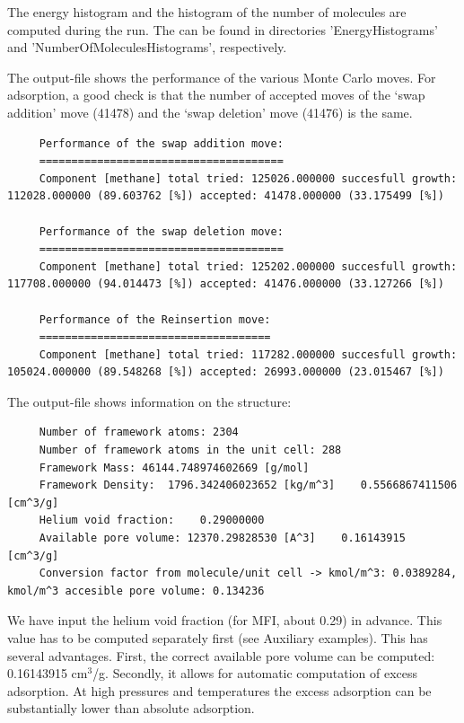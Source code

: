 \noindent
The energy histogram and the histogram of the number of molecules are computed during the run.
The can be found in directories 'EnergyHistograms' and 'NumberOfMoleculesHistograms', respectively.

\noindent
The output-file shows the performance of the various Monte Carlo moves. For adsorption, a good check is that the number of accepted moves
of the `swap addition' move (41478) and the `swap deletion' move (41476) is the same.
\begin{tiny}
\begin{verbatim}
     Performance of the swap addition move:
     ======================================
     Component [methane] total tried: 125026.000000 succesfull growth: 112028.000000 (89.603762 [%]) accepted: 41478.000000 (33.175499 [%])
     
     Performance of the swap deletion move:
     ======================================
     Component [methane] total tried: 125202.000000 succesfull growth: 117708.000000 (94.014473 [%]) accepted: 41476.000000 (33.127266 [%])
     
     Performance of the Reinsertion move:
     ====================================
     Component [methane] total tried: 117282.000000 succesfull growth: 105024.000000 (89.548268 [%]) accepted: 26993.000000 (23.015467 [%])
\end{verbatim}
\end{tiny}

The output-file shows information on the structure:
\begin{tiny}
\begin{verbatim}
     Number of framework atoms: 2304
     Number of framework atoms in the unit cell: 288
     Framework Mass: 46144.748974602669 [g/mol]
     Framework Density:  1796.342406023652 [kg/m^3]    0.5566867411506 [cm^3/g]
     Helium void fraction:    0.29000000
     Available pore volume: 12370.29828530 [A^3]    0.16143915 [cm^3/g]
     Conversion factor from molecule/unit cell -> kmol/m^3: 0.0389284, kmol/m^3 accesible pore volume: 0.134236
\end{verbatim}
\end{tiny}
We have input the helium void fraction (for MFI, about 0.29) in advance. 
This value has to be computed separately first (see Auxiliary examples).
This has several advantages. First, the correct available
pore volume can be computed: 0.16143915 cm$^3$/g. Secondly, it allows for automatic computation of excess adsorption.
At high pressures and temperatures the excess adsorption can be substantially lower than absolute adsorption.


